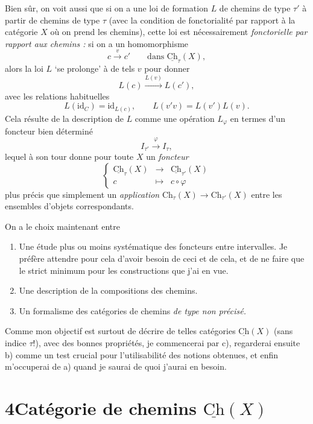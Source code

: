 \documentclass[11pt]{article}
\newcommand{\printedpage}[1]{\if\relax\detokenize{#1}\relax\else\marginpar{\raggedright\footnotesize p.~#1}\fi}
\newcommand{\msp}[1]{\marginpar{\raggedright\footnotesize [#1]}}
\newcommand{\uCh}{\underline{\mathrm{Ch}}}
\begin{document}
Bien sûr, on voit aussi que si on a une loi de formation $L$ de chemins de type $\tau'$ à partir de chemins de type $\tau$ (avec la condition de fonctorialité par rapport à la catégorie $X$ où on prend les chemins), cette loi est nécessairement \textit{fonctorielle par rapport aux chemins :} si on a un homomorphisme
\[
c \xrightarrow{v} c' \qquad \text{dans } \uCh_\tau(X),
\]
\printedpage{15}
alors la loi $L$ ‘se prolonge’ à de tels $v$ pour donner
\[
L(c) \xrightarrow{L(v)} L(c'),
\]
avec les relations habituelles
\[
L(\mathrm{id}_C)=\mathrm{id}_{L(c)}, \qquad L(v'v)=L(v')L(v). %
\]
Cela résulte de la description de $L$ comme une opération $L_\varphi$ en termes d'un foncteur bien déterminé
\[
I_{\tau'} \xrightarrow{\varphi} I_\tau,
\]
lequel à son tour donne pour toute $X$ un \textit{foncteur}
\[
\left\{
\begin{array}{rcl}
\uCh_\tau(X) & \longrightarrow & \uCh_{\tau'}(X)\\[1ex]
c & \longmapsto & c\circ\varphi
\end{array}
\right.
\]
plus précis que simplement un \textit{application} $\mathrm{Ch}_\tau(X)\longrightarrow\mathrm{Ch}_{\tau'}(X)$ entre les ensembles d'objets correspondants. %

\msp{page 24}
On a le choix maintenant entre

\begin{enumerate}[label=\alph*)]
\item Une étude plus ou moins systématique des foncteurs entre intervalles. Je préfère attendre pour cela d'avoir besoin de ceci et de cela, et de ne faire que le strict minimum pour les constructions que j'ai en vue.
\item Une description de la compositions des chemins. %
\item Un formalisme des catégories de chemins \textit{de type non précisé.}
\end{enumerate}

Comme mon objectif est surtout de décrire de telles catégories $\uCh(X)$ (sans indice $\tau$!), avec des bonnes propriétés, je commencerai par c), regarderai ensuite b) comme un test crucial pour l'utilisabilité des notions obtenues, et enfin m'occuperai de a) quand je saurai de quoi j'aurai en besoin.

\printedpage{16}

\section*{4\quad Catégorie de chemins $\uCh(X)$}
\end{document}
